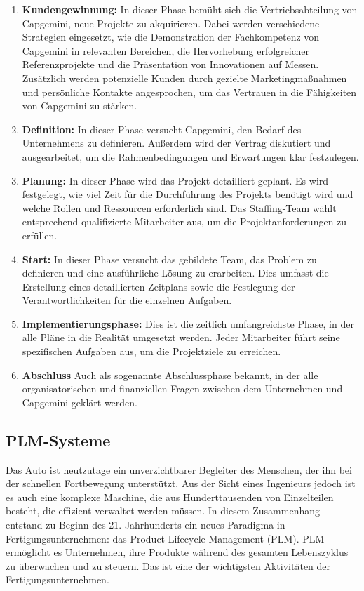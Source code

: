 \documentclass[a4paper, 12pt]{scrartcl}
\begin{document}
	\begin{enumerate}
	\item \textbf{Kundengewinnung:} In dieser Phase bemüht sich die Vertriebsabteilung von 		Capgemini, neue Projekte zu akquirieren. Dabei werden verschiedene Strategien eingesetzt, wie die Demonstration der Fachkompetenz von Capgemini in relevanten Bereichen, die Hervorhebung erfolgreicher Referenzprojekte und die Präsentation von Innovationen auf Messen. Zusätzlich werden potenzielle Kunden durch gezielte Marketingmaßnahmen und persönliche Kontakte angesprochen, um das Vertrauen in die Fähigkeiten von Capgemini zu stärken.
	\item \textbf{Definition:} In dieser Phase versucht Capgemini, den Bedarf des
	Unternehmens zu definieren. Außerdem wird der Vertrag diskutiert und ausgearbeitet, um die Rahmenbedingungen und Erwartungen klar festzulegen.

	\item \textbf{Planung:} In dieser Phase wird das Projekt detailliert geplant. Es wird 
	festgelegt, wie viel Zeit für die Durchführung des Projekts benötigt wird und welche Rollen und Ressourcen erforderlich sind. Das Staffing-Team wählt entsprechend qualifizierte Mitarbeiter aus, um die Projektanforderungen zu erfüllen.
	\item \textbf{Start:} In dieser Phase versucht das gebildete Team, das Problem zu definieren und eine ausführliche Lösung zu erarbeiten. Dies umfasst die Erstellung eines detaillierten Zeitplans sowie die Festlegung der Verantwortlichkeiten für die einzelnen Aufgaben.
	\item \textbf{Implementierungsphase:} Dies ist die zeitlich umfangreichste Phase, in der alle Pläne in die Realität umgesetzt werden. Jeder Mitarbeiter führt seine spezifischen Aufgaben aus, um die Projektziele zu erreichen.
	\item \textbf{Abschluss} Auch als sogenannte Abschlussphase bekannt, in der alle organisatorischen und finanziellen Fragen zwischen dem Unternehmen und Capgemini geklärt werden.
	\end{enumerate}
	\subsection{PLM-Systeme}
	Das Auto ist heutzutage ein unverzichtbarer Begleiter des Menschen, der ihn bei der schnellen Fortbewegung unterstützt. Aus der Sicht eines Ingenieurs jedoch ist es auch eine komplexe Maschine, die aus Hunderttausenden von Einzelteilen besteht, die effizient verwaltet werden müssen. In diesem Zusammenhang entstand zu Beginn des 21. Jahrhunderts ein neues Paradigma in Fertigungsunternehmen: das Product Lifecycle Management (PLM). PLM ermöglicht es Unternehmen, ihre Produkte während des gesamten Lebenszyklus zu überwachen und zu steuern. Das ist eine der wichtigsten Aktivitäten der Fertigungsunternehmen\cite{stark2011product}.
\end{document}
